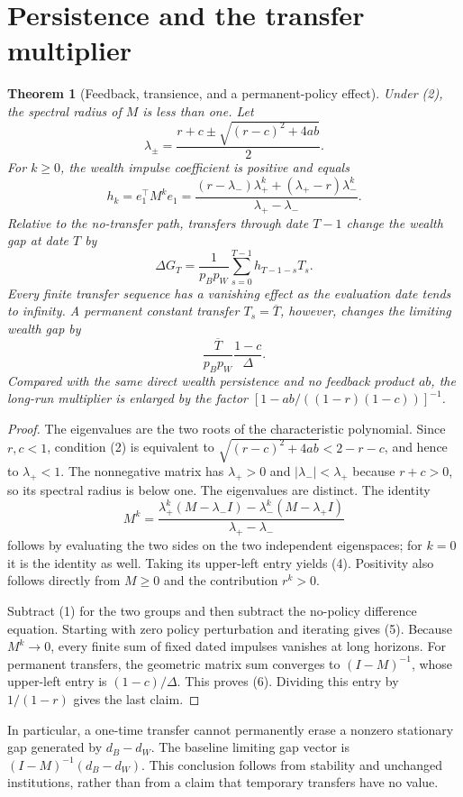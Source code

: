 \documentclass[11pt,a4paper]{article}
\newtheorem{theorem}{Theorem}[section]
\theoremstyle{remark}
\begin{document}
\section{Persistence and the transfer multiplier}
\begin{theorem}[Feedback, transience, and a permanent-policy effect]
Under (2), the spectral radius of $M$ is less than one. Let
\[
 \lambda_\pm=\frac{r+c\pm\sqrt{(r-c)^2+4ab}}2.
\]
For $k\ge0$, the wealth impulse coefficient is positive and equals
\[
 h_k=e_1^\top M^ke_1
 =\frac{(r-\lambda_-)\lambda_+^k+(\lambda_+-r)\lambda_-^k}
        {\lambda_+-\lambda_-}. \tag{4}
\]
Relative to the no-transfer path, transfers through date $T-1$ change the wealth gap at date $T$ by
\[
 \Delta G_T=\frac1{p_Bp_W}\sum_{s=0}^{T-1}h_{T-1-s}T_s. \tag{5}
\]
Every finite transfer sequence has a vanishing effect as the evaluation date tends to infinity. A permanent constant transfer $T_s=\overline T$, however, changes the limiting wealth gap by
\[
 \frac{\overline T}{p_Bp_W}\frac{1-c}{\Delta}. \tag{6}
\]
Compared with the same direct wealth persistence and no feedback product $ab$, the long-run multiplier is enlarged by the factor
$[1-ab/((1-r)(1-c))]^{-1}$.
\end{theorem}
\begin{proof}
The eigenvalues are the two roots of the characteristic polynomial. Since $r,c<1$, condition (2) is equivalent to
$\sqrt{(r-c)^2+4ab}<2-r-c$, and hence to $\lambda_+<1$. The nonnegative matrix has $\lambda_+>0$ and $|\lambda_-|<\lambda_+$ because $r+c>0$, so its spectral radius is below one. The eigenvalues are distinct. The identity
\[
 M^k=\frac{\lambda_+^k(M-\lambda_-I)-\lambda_-^k(M-\lambda_+I)}{\lambda_+-\lambda_-}
\]
follows by evaluating the two sides on the two independent eigenspaces; for $k=0$ it is the identity as well. Taking its upper-left entry yields (4). Positivity also follows directly from $M\ge0$ and the contribution $r^k>0$.

Subtract (1) for the two groups and then subtract the no-policy difference equation. Starting with zero policy perturbation and iterating gives (5). Because $M^k\to0$, every finite sum of fixed dated impulses vanishes at long horizons. For permanent transfers, the geometric matrix sum converges to $(I-M)^{-1}$, whose upper-left entry is $(1-c)/\Delta$. This proves (6). Dividing this entry by $1/(1-r)$ gives the last claim.
\end{proof}
In particular, a one-time transfer cannot permanently erase a nonzero stationary gap generated by $d_B-d_W$. The baseline limiting gap vector is $(I-M)^{-1}(d_B-d_W)$. This conclusion follows from stability and unchanged institutions, rather than from a claim that temporary transfers have no value.
\end{document}
